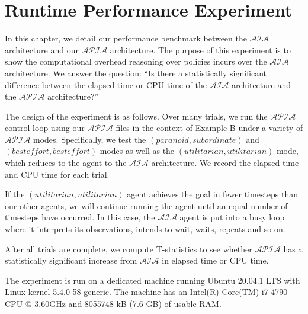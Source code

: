 \chapter{Runtime Performance Experiment}

%

In this chapter, we detail our performance benchmark between the $\mathcal{AIA}$ architecture and our $\mathcal{APIA}$ architecture.
The purpose of this experiment is to show the computational overhead reasoning over policies incurs over the $\mathcal{AIA}$ architecture.
We answer the question: ``Is there a statistically significant difference between the elapsed time or CPU time of the $\mathcal{AIA}$ architecture and the $\mathcal{APIA}$ architecture?''

The design of the experiment is as follows.
Over many trials, we run the $\mathcal{APIA}$ control loop using our $\mathcal{APIA}$ files in the context of Example B under a variety of $\mathcal{APIA}$ modes.
Specifically, we test the $(paranoid, subordinate)$ and $(best effort, best effort)$ modes as well as the $(utilitarian, utilitarian)$ mode, which reduces to the agent to the $\mathcal{AIA}$ architecture.
We record the elapsed time and CPU time for each trial.

If the $(utilitarian, utilitarian)$ agent achieves the goal in fewer timesteps than our other agents, we will continue running the agent until an equal number of timesteps have occurred.
In this case, the $\mathcal{AIA}$ agent is put into a busy loop where it interprets its observations, intends to wait, waits, repeats and so on.

After all trials are complete, we compute T-statistics to see whether $\mathcal{APIA}$ has a statistically significant increase from $\mathcal{AIA}$ in elapsed time or CPU time.

The experiment is run on a dedicated machine running Ubuntu 20.04.1 LTS with Linux kernel 5.4.0-58-generic.
The machine has an Intel(R) Core(TM) i7-4790 CPU @ 3.60GHz and 8055748 kB (7.6 GB) of usable RAM.
